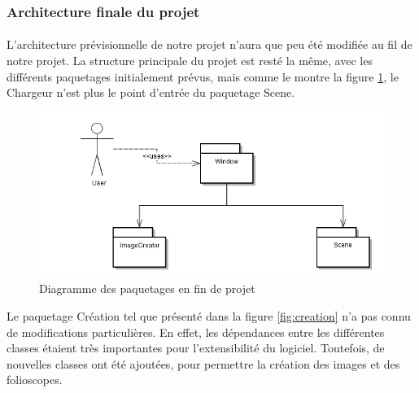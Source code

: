 \subsubsection{Architecture finale du projet}
\paragraph{}
L'architecture prévisionnelle de notre projet n'aura que peu été modifiée au fil de notre projet. La structure principale du projet est resté la même, avec les différents paquetages initialement prévus, mais comme le montre la figure \ref{fig:archi}, le Chargeur n'est plus le point d'entrée du paquetage Scene.

\begin{figure}[h]
		\centering
                \includegraphics[scale=0.5]{paquetages.png}
		\caption{\label{fig:archi} Diagramme des paquetages en fin de projet \protect \footnotemark}
\end{figure}


Le paquetage Création tel que présenté dans la figure \ref{fig:creation} n'a pas connu de modifications particulières. En effet, les dépendances entre les différentes classes étaient très importantes pour l'extensibilité du logiciel. Toutefois, de nouvelles classes ont été ajoutées, pour permettre la création des images et des folioscopes.


